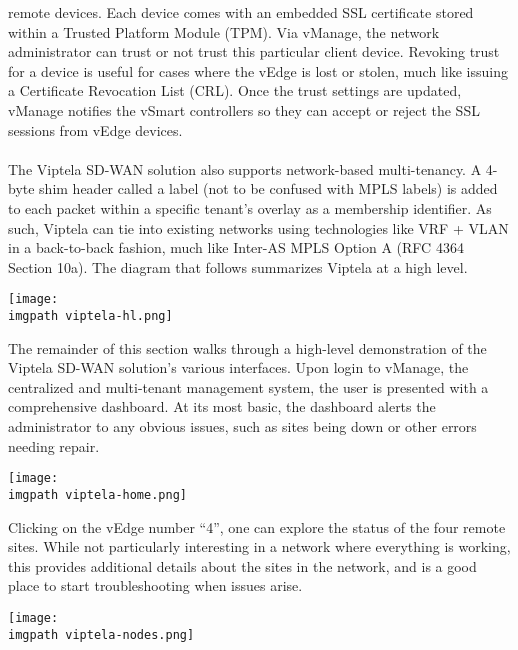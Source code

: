 remote devices. Each device comes with an embedded SSL certificate stored
within a Trusted Platform Module (TPM). Via vManage, the network administrator
can trust or not trust this particular client device. Revoking trust for a
device is useful for cases where the vEdge is lost or stolen, much like
issuing a Certificate Revocation List (CRL). Once the trust settings are
updated, vManage notifies the vSmart controllers so they can accept or reject
the SSL sessions from vEdge devices.
\\ \\
The Viptela SD-WAN solution also supports network-based multi-tenancy. A
4-byte shim header called a label (not to be confused with MPLS labels) is
added to each packet within a specific tenant’s overlay as a membership
identifier. As such, Viptela can tie into existing networks using technologies
like VRF + VLAN in a back-to-back fashion, much like Inter-AS MPLS Option A
(RFC 4364 Section 10a). The diagram that follows summarizes Viptela at a high level.

    \begin{minipage}[t]{\linewidth}
	  \centering
      \texttt{[image: \\imgpath viptela-hl.png]}
    \end{minipage}

The remainder of this section walks through a high-level demonstration of the
Viptela SD-WAN solution's various interfaces. Upon login to vManage, the
centralized and multi-tenant management system, the user is presented with a
comprehensive dashboard. At its most basic, the dashboard alerts the
administrator to any obvious issues, such as sites being down or other errors
needing repair.

    \begin{minipage}[t]{\linewidth}
	  \centering
      \texttt{[image: \\imgpath viptela-home.png]}
    \end{minipage}

Clicking on the vEdge number ``4'', one can explore the status of the four
remote sites. While not particularly interesting in a network where everything
is working, this provides additional details about the sites in the network,
and is a good place to start troubleshooting when issues arise.

    \begin{minipage}[t]{\linewidth}
	  \centering
      \texttt{[image: \\imgpath viptela-nodes.png]}
    \end{minipage}


